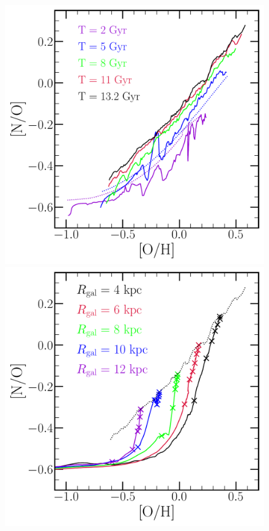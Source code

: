 \documentclass[ms.tex]{subfiles}
\begin{document}
\begin{figure} 
\centering 
\includegraphics[scale = 0.3]{no_oh_timeevol.pdf} 
\includegraphics[scale = 0.3]{no_oh_superposition.pdf} 

\end{figure}
\end{document}
